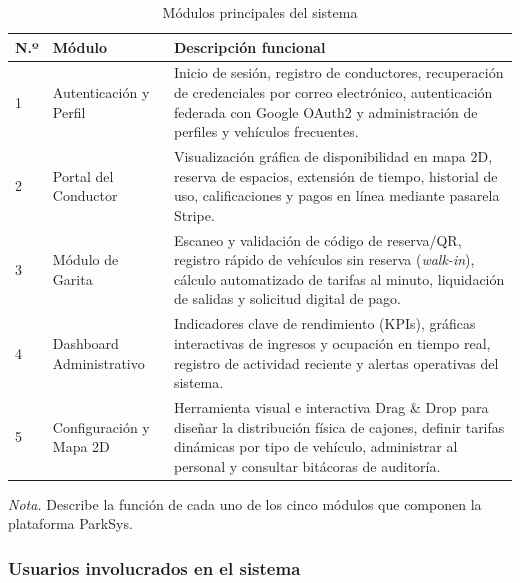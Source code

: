 \begin{table}[htbp]
\caption{Módulos principales del sistema}
\label{tab:modulos}
\begin{tabular}{@{}p{0.5cm} p{3.5cm} p{11cm}@{}}
\toprule
\textbf{N.º} & \textbf{Módulo} & \textbf{Descripción funcional} \\
\midrule
1 & Autenticación y Perfil & Inicio de sesión, registro de conductores, recuperación de credenciales por correo electrónico, autenticación federada con Google OAuth2 y administración de perfiles y vehículos frecuentes. \\
2 & Portal del Conductor & Visualización gráfica de disponibilidad en mapa 2D, reserva de espacios, extensión de tiempo, historial de uso, calificaciones y pagos en línea mediante pasarela Stripe. \\
3 & Módulo de Garita & Escaneo y validación de código de reserva/QR, registro rápido de vehículos sin reserva (\textit{walk-in}), cálculo automatizado de tarifas al minuto, liquidación de salidas y solicitud digital de pago. \\
4 & Dashboard Administrativo & Indicadores clave de rendimiento (KPIs), gráficas interactivas de ingresos y ocupación en tiempo real, registro de actividad reciente y alertas operativas del sistema. \\
5 & Configuración y Mapa 2D & Herramienta visual e interactiva Drag \& Drop para diseñar la distribución física de cajones, definir tarifas dinámicas por tipo de vehículo, administrar al personal y consultar bitácoras de auditoría. \\
\bottomrule
\end{tabular}
\par\vspace{0.2cm}
\textit{Nota.} Describe la función de cada uno de los cinco módulos que componen la plataforma ParkSys.
\end{table}

\subsubsection{Usuarios involucrados en el sistema}



